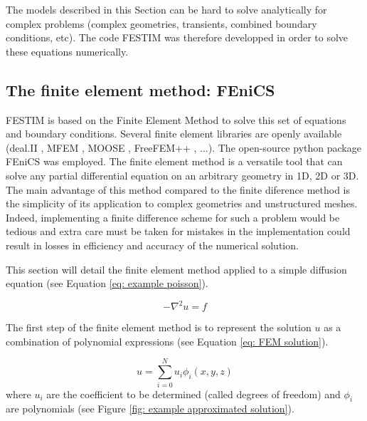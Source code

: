 The models described in this Section can be hard to solve analytically for complex problems (complex geometries, transients, combined boundary conditions, etc).
The code FESTIM  was therefore developped in order to solve these equations numerically.

\subsection{The finite element method: FEniCS}
FESTIM is based on the Finite Element Method to solve this set of equations and boundary conditions.
Several finite element libraries are openly available (deal.II , MFEM , MOOSE , FreeFEM++ , ...).
The open-source python package FEniCS  was employed.
The finite element method is a versatile tool that can solve any partial differential equation on an arbitrary geometry in 1D, 2D or 3D.
The main advantage of this method compared to the finite diference method is the simplicity of its application to complex geometries and unstructured meshes.
Indeed, implementing a finite difference scheme for such a problem would be tedious and extra care must be taken for mistakes in the implementation could result in losses in efficiency and accuracy of the numerical solution.

This section will detail the finite element method applied to a simple diffusion equation (see Equation \ref{eq: example poisson}).

\begin{equation}
    -\nabla^2 u = f
    \label{eq: example poisson}
\end{equation}

The first step of the finite element method is to represent the solution $u$ as a combination of polynomial expressions (see Equation \ref{eq: FEM solution}).

\begin{equation}
    u = \sum^N_{i=0}u_i \phi_i(x, y, z)
    \label{eq: FEM solution}
\end{equation}
where $u_i$ are the coefficient to be determined (called degrees of freedom) and $\phi_i$ are polynomials (see Figure \ref{fig: example approximated solution}).

